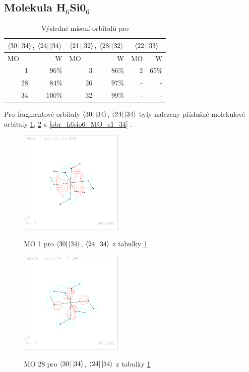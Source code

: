 \documentclass[
  digital, %
  table,   %
  lof,     %
  lot,     %
]{fithesis3}
\begin{document}
  \subsection{Molekula H$_6$Si0$_6$}
 
  \begin{table}[htbp]
\caption{Výsledné mísení orbitalů pro }
\begin{center}
\begin{tabular}{|r|r|r|r|r|r|}
\hline
\multicolumn{2}{|c}{$\bra{30}\ket{34}$, $\bra{24}\ket{34}$} & \multicolumn{2}{|c|}{$\bra{21}\ket{32}$, $\bra{28}\ket{32}$}& \multicolumn{2}{|c|}{$\bra{22}\ket{33}$} \\
\hline \hline
\multicolumn{1}{|l|}{MO} & \multicolumn{1}{r|}{W} & \multicolumn{1}{l|}{MO} & \multicolumn{1}{r|}{W} & MO & \multicolumn{1}{r|}{W} \\ \hline
1 & 96\% & 3 & 86\% &2 & 65\% \\ \hline
28 & 84\% & 26 & 97\% & - & - \\ \hline
34 & 100\% & 32 & 99\% &  -& - \\ \hline
\end{tabular}
\end{center}
\label{tab_h6sio6_vysledky}
\end{table}

Pro fragmentové orbitaly $\bra{30}\ket{34}$, $\bra{24}\ket{34}$ byly nalezeny příslušné molekulové orbitaly \ref{obr_h6sio6_MO_s1_1}, \ref{obr_h6sio6_MO_s1_28} a \ref{obr_h6sio6_MO_s1_34} .
  
  \begin{figure}[h]
\caption{MO 1 pro $\bra{30}\ket{34}$, $\bra{24}\ket{34}$  z tabulky \ref{tab_h6sio6_vysledky}}
  \center
  \includegraphics[width=5cm]{h6sio6_obrazky/s1_1.eps}
  \label{obr_h6sio6_MO_s1_1}
  \end{figure}
 
 \begin{figure}[h]
\caption{MO 28 pro $\bra{30}\ket{34}$, $\bra{24}\ket{34}$  z tabulky \ref{tab_h6sio6_vysledky}}
  \center
  \includegraphics[width=5cm]{h6sio6_obrazky/s1_28.eps}
  \label{obr_h6sio6_MO_s1_28}
  \end{figure}
\end{document}

